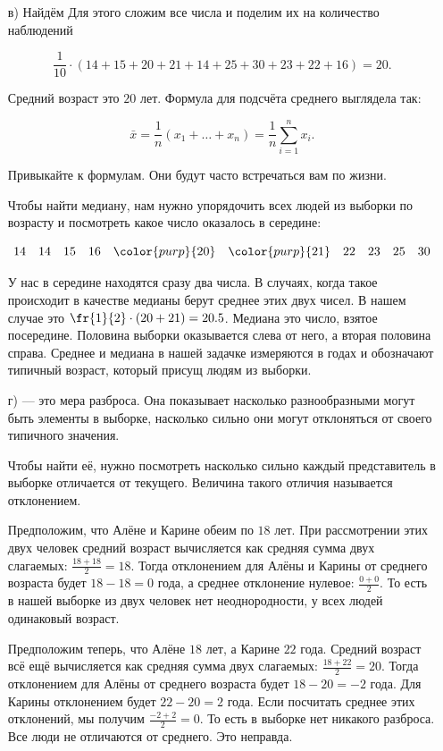 \documentclass[12pt, a4paper, oneside]{article}
\begin{document}
\begin{sol}
\begin{enumerate}
	\item[в)]  Найдём  Для этого сложим все числа и поделим их на количество наблюдений
	
	\[
	\frac{1}{10} \cdot (14 + 15 + 20 + 21 + 14 + 25 + 30 + 23 + 22 + 16) = 20.
	\]
	
	Средний возраст это $20$ лет.  Формула для подсчёта среднего выглядела так:
	
	\[
	\bar x = \frac{1}{n} (x_1 + \ldots + x_n) = \frac{1}{n} \sum_{i=1}^n x_i.
	\]
	
	Привыкайте к формулам. Они будут часто встречаться вам по жизни. 
	
	Чтобы найти медиану, нам нужно упорядочить всех людей из выборки по возрасту и посмотреть какое число оказалось в середине:
	
	\[
	14 \quad 14  \quad 15  \quad 16  \quad {\color{purp}{20}}  \quad {\color{purp}{21}}  \quad 22  \quad 23  \quad 25  \quad 30
	\]
	
	У нас в середине находятся сразу два числа. В случаях, когда такое происходит в качестве медианы берут среднее этих двух чисел. В нашем случае это $\fr{1}{2} \cdot (20 + 21) = 20.5$. Медиана это число, взятое посередине. Половина выборки оказывается слева от него, а вторая половина справа. Среднее и медиана в нашей задачке измеряются в годах и обозначают типичный возраст, который присущ людям из выборки. 
	
	\item[г)]   --- это мера разброса. Она показывает насколько разнообразными могут быть элементы в выборке, насколько сильно они могут отклоняться от своего типичного значения. 
	
	Чтобы найти её, нужно посмотреть насколько сильно каждый представитель в выборке отличается от текущего. Величина такого отличия называется отклонением.
	
	Предположим, что Алёне и Карине обеим по $18$ лет. При рассмотрении этих двух человек средний возраст вычисляется как средняя сумма двух слагаемых: $\frac{18 + 18}{2} = 18$. Тогда отклонением для Алёны и Карины от среднего возраста будет $18 - 18 = 0$ года, а среднее отклонение нулевое: $\frac{0 + 0}{2}$. То есть в нашей выборке из двух человек нет неоднородности, у всех людей одинаковый возраст.
	
	Предположим теперь, что Алёне $18$ лет, а Карине $22$ года. Средний возраст всё ещё вычисляется как средняя сумма двух слагаемых: $\frac{18 + 22}{2} = 20$. Тогда отклонением для Алёны от среднего возраста будет $18 - 20 = -2$ года. Для Карины отклонением будет $22 - 20 = 2$ года. 
	Если посчитать среднее этих отклонений, мы получим $\frac{-2 + 2}{2} = 0$. То есть в выборке нет никакого разброса. Все люди не отличаются от среднего. Это неправда.
	

\end{enumerate}
\end{sol}
\end{document}
